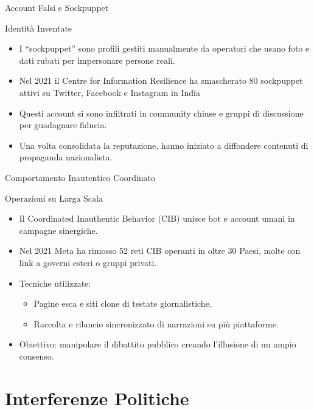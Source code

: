 \documentclass[12pt]{beamer}
\begin{document}
\begin{frame}{Account Falsi e Sockpuppet}
  \small
  \begin{alertblock}{Identità Inventate}
    \begin{itemize}
      \item I “sockpuppet” sono profili gestiti manualmente da operatori che usano foto e dati rubati per impersonare persone reali.
      \item Nel 2021 il Centre for Information Resilience ha smascherato 80 sockpuppet attivi su Twitter, Facebook e Instagram in India \cite{strick2021realsikh}
      \item Questi account si sono infiltrati in community chiuse e gruppi di discussione per guadagnare fiducia.
      \item Una volta consolidata la reputazione, hanno iniziato a diffondere contenuti di propaganda nazionalista.
    \end{itemize}
  \end{alertblock}
\end{frame}

\begin{frame}{Comportamento Inautentico Coordinato}
  \small
  \begin{alertblock}{Operazioni su Larga Scala}
    \begin{itemize}
      \item Il Coordinated Inauthentic Behavior (CIB) unisce bot e account umani in campagne sinergiche.
      \item Nel 2021 Meta ha rimosso 52 reti CIB operanti in oltre 30 Paesi, molte con link a governi esteri o gruppi privati.\cite{meta_report}\cite{dfrlab_briefing}
      \item Tecniche utilizzate:
        \begin{itemize}
          \item Pagine esca e siti clone di testate giornalistiche.  
          \item Raccolta e rilancio sincronizzato di narrazioni su più piattaforme.
        \end{itemize}
      \item Obiettivo: manipolare il dibattito pubblico creando l’illusione di un ampio consenso.
    \end{itemize}
  \end{alertblock}
\end{frame}


\section{Interferenze Politiche}
\end{document}
